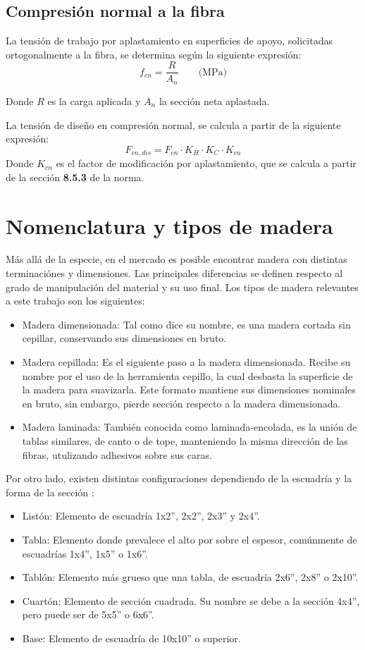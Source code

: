 \subsection{Compresión normal a la fibra}
La tensión de trabajo por aplastamiento en superficies de apoyo, solicitadas ortogonalmente a la fibra, se determina según la siguiente expresión:
\begin{equation}
	f_{cn}= \frac{R}{A_n} \qquad \text{(MPa)}
\end{equation}

Donde $R$ es la carga aplicada y $A_n$ la sección neta aplastada.

La tensión de diseño en compresión normal, se calcula a partir de la siguiente expresión:
\begin{equation}
	F_{cn,dis} = F_{cn} \cdot K_H \cdot K_C \cdot K_{cn}
\end{equation}
Donde $K_{cn}$ es el factor de modificación por aplastamiento, que se calcula a partir de la sección \textbf{8.5.3} de la norma.


\section{Nomenclatura y tipos de madera}
Más allá de la especie, en el mercado es posible encontrar madera con distintas terminaciónes y dimensiones. Las principales diferencias se definen respecto al grado de manipulación del material y su uso final. Los tipos de madera relevantes a este trabajo son los siguientes:
\begin{itemize}
	\item Madera dimensionada: Tal como dice su nombre, es una madera cortada sin cepillar, conservando sus dimensiones en bruto.
	\item Madera cepillada: Es el siguiente paso a la madera dimensionada. Recibe su nombre por el uso de la herramienta cepillo, la cual desbasta la superficie de la madera para suavizarla. Este formato mantiene sus dimensiones nominales en bruto, sin embargo, pierde sección respecto a la madera dimensionada.
	\item Madera laminada: También conocida como laminada-encolada, es la unión de tablas similares, de canto o de tope, manteniendo la misma dirección de las fibras, utulizando adhesivos sobre sus caras.
\end{itemize}

Por otro lado, existen distintas configuraciones dependiendo de la escuadría y la forma de la sección \cite{sistemasconstructivos}:
\begin{itemize}
	\item Listón: Elemento de escuadría 1x2'', 2x2'', 2x3'' y 2x4''.
	\item Tabla: Elemento donde prevalece el alto por sobre el espesor, comúnmente de escuadrías 1x4'', 1x5'' o 1x6''.
	\item Tablón: Elemento más grueso que una tabla, de escuadría 2x6'', 2x8'' o 2x10''.
	\item Cuartón: Elemento de sección cuadrada. Su nombre se debe a la sección 4x4'', pero puede ser de 5x5'' o 6x6''.
	\item Base: Elemento de escuadría de 10x10'' o superior. 
\end{itemize}


